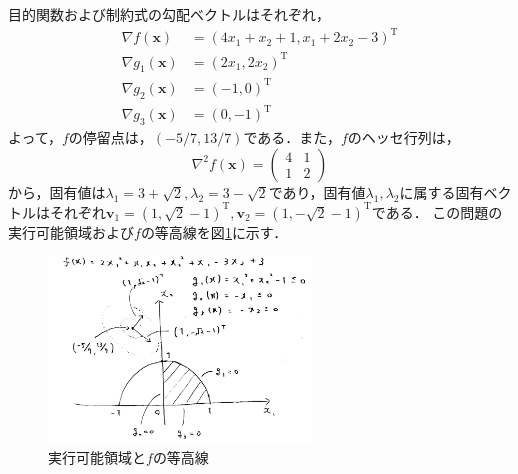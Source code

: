 \documentclass{jsreport}
\begin{document}
目的関数および制約式の勾配ベクトルはそれぞれ，
\begin{align}
  \nabla f(\bm{x}) &= (4x_1 + x_2 + 1, x_1 + 2x_2 - 3)^{\mathrm{T}} \nonumber \\
  \nabla g_1(\bm{x}) &= (2x_1, 2x_2)^{\mathrm{T}} \nonumber \\
  \nabla g_2(\bm{x}) &= (-1, 0)^{\mathrm{T}} \nonumber \\
  \nabla g_3(\bm{x}) &= (0, -1)^{\mathrm{T}} \nonumber
\end{align}
よって，$f$の停留点は，$(-5/7, 13/7)$である．また，$f$のヘッセ行列は，
\begin{equation}
  \nabla^2 f(\bm{x}) = \left(
  \begin{array}{cc}
    4 & 1 \\
    1 & 2
  \end{array}
  \right) \nonumber
\end{equation}
から，固有値は$\lambda_1 = 3 + \sqrt{2}, \lambda_2 = 3 - \sqrt{2}$であり，固有値$\lambda_1, \lambda_2$に属する固有ベクトルはそれぞれ$\bm{v}_1 = (1, \sqrt{2} - 1)^{\mathrm{T}}, \bm{v}_2 = (1, -\sqrt{2} - 1)^{\mathrm{T}}$である．
この問題の実行可能領域および$f$の等高線を図\ref{fig:feasible_f}に示す．
\begin{figure}[tb]
  \centering
  \includegraphics[clip, width=7cm]{../figure/KKT_1.pdf}
  \caption{実行可能領域と$f$の等高線}
  \label{fig:feasible_f}
\end{figure}
\end{document}
